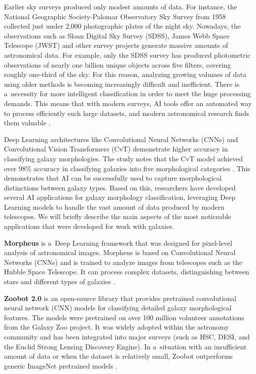 Earlier sky surveys produced only modest amounts of data. For instance, the National Geographic Society-Palomar Observatory Sky Survey from 1958 collected just under 2,000 photographic plates of the night sky. Nowadays, the observations such as Sloan Digital Sky Survey (SDSS), James Webb Space Telescope (JWST) and other survey projects generate massive amounts of astronomical data. For example, only the SDSS survey has produced photometric observations of nearly one billion unique objects across five filters, covering roughly one-third of the sky. For this reason, analyzing growing volumes of data using older methods is becoming increasingly difficult and inefficient. There is a~necessity for more intelligent classification in order to meet the huge processing demands. This means that with modern surveys, AI tools offer an automated way to process efficiently such large datasets, and modern astronomical research finds them valuable \cite{Li_2023}.

Deep Learning architectures like Convolutional Neural Networks (CNNs) and Convolutional Vision Transformers (CvT) demonstrate higher accuracy in classifying galaxy morphologies. The study notes that the CvT model achieved over 98\% accuracy in classifying galaxies into five morphological categories \cite{cao2024galaxy}. This demonstrates that AI can be successfully used to capture morphological distinctions between galaxy types. Based on this, researchers have developed several AI applications for galaxy morphology classification, leveraging Deep Learning models to handle the vast amount of data produced by modern telescopes. We will briefly describe the main aspects of the most noticeable applications that were developed for work with galaxies.

\medskip

\textbf{Morpheus} is a~Deep Learning framework that was designed for pixel-level analysis of astronomical images. Morpheus is based on Convolutional Neural Networks (CNNs) and is trained to analyze images from telescopes such as the Hubble Space Telescope. It can process complex datasets, distinguishing between stars and different types of galaxies \cite{Hausen_2020}.

\medskip

\textbf{Zoobot 2.0} is an open-source library that provides pretrained convolutional neural network (CNN) models for classifying detailed galaxy morphological features. The models were pretrained on over 100 million volunteer annotations from the Galaxy Zoo project. It was widely adopted within the astronomy community and has been integrated into major surveys (such as HSC, DESI, and the Euclid Strong Lensing Discovery Engine). In a~situation with an insufficient amount of data or when the dataset is relatively small, Zoobot outperforms generic ImageNet pretrained models \cite{walmsley2024scalinglawsgalaxyimages}.

